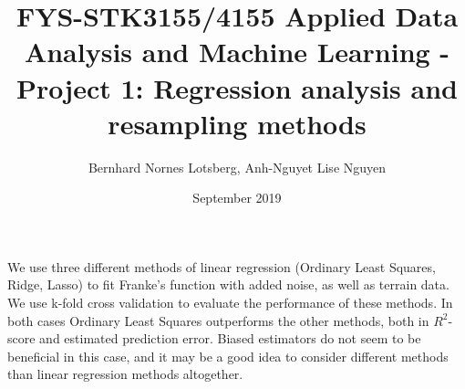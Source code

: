 \documentclass[a4paper, 10pt]{article}
\title{FYS-STK3155/4155 Applied Data Analysis and Machine Learning - Project 1: Regression analysis and resampling methods }
\author{Bernhard Nornes Lotsberg, Anh-Nguyet Lise Nguyen}
\date{September 2019}
\renewenvironment{abstract}
 {\small
  \begin{center}
  \bfseries \abstractname\vspace{-.5em}\vspace{0pt}
  \end{center}
  \list{}{%
    \setlength{\leftmargin}{2.5 cm}%
    \setlength{\rightmargin}{\leftmargin}%
  }%
  \item\relax}
 {\endlist}
\begin{document}
\maketitle


\begin{abstract} \noindent
    We use three different methods of linear regression (Ordinary Least Squares, Ridge, Lasso) to fit Franke's function with added noise, as well as terrain data. We use k-fold cross validation to evaluate the performance of these methods. In both cases Ordinary Least Squares outperforms the other methods, both in $R^2$-score and estimated prediction error. Biased estimators do not seem to be beneficial in this case, and it may be a good idea to consider different methods than linear regression methods altogether.
\end{abstract}
\end{document}

